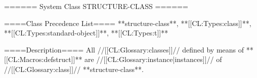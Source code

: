 ====== System Class STRUCTURE-CLASS ======

====Class Precedence List====
**structure-class**, **[[CL:Types:class]]**, **[[CL:Types:standard-object]]**, **[[CL:Types:t]]**

====Description====
All //[[CL:Glossary:classes]]// defined by means of **[[CL:Macros:defstruct]]** are //[[CL:Glossary:instance|instances]]// of //[[CL:Glossary:class]]// **structure-class**.

